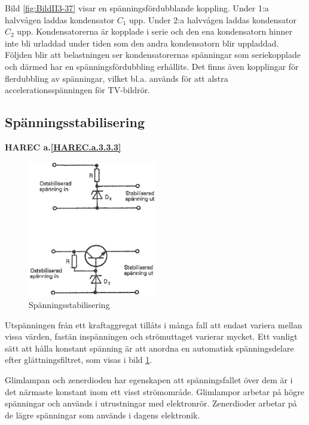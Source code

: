 Bild \ref{fig:BildII3-37} visar en spänningsfördubblande koppling.
Under 1:a halvvågen laddas kondensator \(C_1\) upp.
Under 2:a halvvågen laddas kondensator \(C_2\) upp.
Kondensatorerna är kopplade i serie och den ena kondensatorn hinner inte bli
urladdad under tiden som den andra kondensatorn blir uppladdad.
Följden blir att belastningen ser kondensatorernas spänningar som seriekopplade
och därmed har en spänningsfördubbling erhållits.
Det finns även kopplingar för flerdubbling av spänningar, vilket bl.a. används
för att alstra accelerationsspänningen för TV-bildrör.

\subsection{Spänningsstabilisering}
\textbf{HAREC a.\ref{HAREC.a.3.3.3}\label{myHAREC.a.3.3.3}}

\begin{figure}
\includegraphics[width=0.5\textwidth]{images/cropped_pdfs/bild_2_3-38.pdf}
\caption{Spänningsstabilisering}
\label{fig:BildII3-38}
\end{figure}

Utspänningen från ett kraftaggregat tillåts i många fall att endast variera
mellan vissa värden, fastän inspänningen och strömuttaget varierar mycket.
Ett vanligt sätt att hålla konstant spänning är att anordna en automatisk
spänningsdelare efter glättningsfiltret, som visas i bild \ref{fig:BildII3-38}.

Glimlampan och zenerdioden har egenskapen att spänningsfallet över dem är i det
närmaste konstant inom ett visst strömområde.
Glimlampor arbetar på högre spänningar och används i utrustningar med
elektronrör.
Zenerdioder arbetar på de lägre spänningar som används i dagens elektronik.

